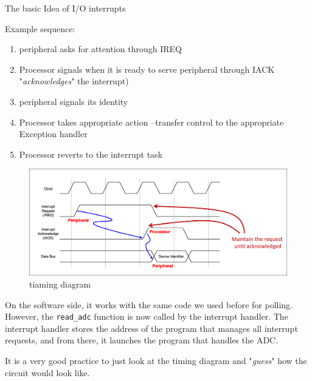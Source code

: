 \begin{parag}{The basic Idea of I/O interrupts}
\begin{center}
	\end{center}
	\begin{subparag}{Example sequence}:
	    \begin{enumerate}
	        \item peripheral asks for attention through IREQ
	        \item Processor signals when it is ready to serve peripheral through IACK "\textit{acknowledges}" the interrupt)
	        \item peripheral signals its identity
	        \item Processor takes appropriate action --transfer control to the appropriate Exception handler
	        \item Processor reverts to the interrupt task
	    \end{enumerate}
	
	\end{subparag}
\end{parag}
		\begin{figure}[h!]
		    \centering
			\includegraphics[scale=0.2]{screenshots/2025-10-22_14.png}
			\caption{tiaming diagram}
		\end{figure}
\begin{framedremark}
	On the software side, it works with the same code we used before for polling. However, the \texttt{read\_adc} function is now called by the interrupt handler. The interrupt handler stores the address of the program that manages all interrupt requests, and from there, it launches the program that handles the ADC.
\end{framedremark}
\begin{framedremark}
It is a very good practice to just look at the timing diagram and "\textit{guess}" how the circuit would look like.
\end{framedremark}
